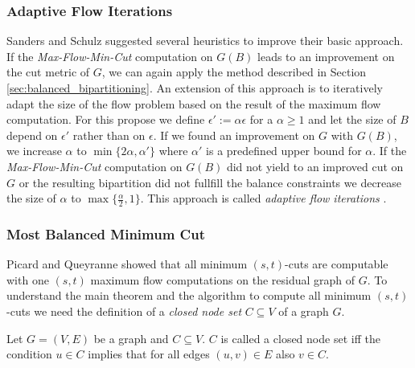 
\subsubsection{Adaptive Flow Iterations}
\label{sec:adaptive_flow_iterations}

Sanders and Schulz \cite{sanders2011engineering} suggested several heuristics to improve
their basic approach. If the \emph{Max-Flow-Min-Cut} computation on $G(B)$ leads to an
improvement on the cut metric of $G$, we can again apply the method described in Section 
\ref{sec:balanced_bipartitioning}. An extension of this approach is to iteratively adapt the
size of the flow problem based on the result of the maximum flow computation. For this propose
we define $\epsilon' := \alpha\epsilon$ for a $\alpha \ge 1$ and let the size of $B$ depend
on $\epsilon'$ rather than on $\epsilon$. If we found an improvement on $G$ with $G(B)$, we
increase $\alpha$ to $\min\{2\alpha, \alpha'\}$ where $\alpha'$ is a predefined upper bound
for $\alpha$. If the \emph{Max-Flow-Min-Cut} computation on $G(B)$ did not yield to an 
improved cut on $G$ or the resulting bipartition did not fullfill the balance constraints we
decrease the size of $\alpha$ to $\max\{\frac{\alpha}{2},1\}$. This approach is called
\emph{adaptive flow iterations} \cite{sanders2011engineering}.

\subsubsection{Most Balanced Minimum Cut}
\label{sec:related_mbmc}

Picard and Queyranne \cite{picard1980structure} showed that all minimum $(s,t)$-cuts 
are computable with one $(s,t)$ maximum flow computations on the residual graph of $G$.
To understand the main theorem and the algorithm to compute all minimum $(s,t)$-cuts we
need the definition of a \emph{closed node set} $C \subseteq V$ of a graph $G$.

\begin{definition}
Let $G = (V,E)$ be a graph and $C \subseteq V$. $C$ is called a closed node set iff the 
condition $u \in C$ implies that for all edges $(u,v) \in E$ also $v \in C$.
\end{definition}

